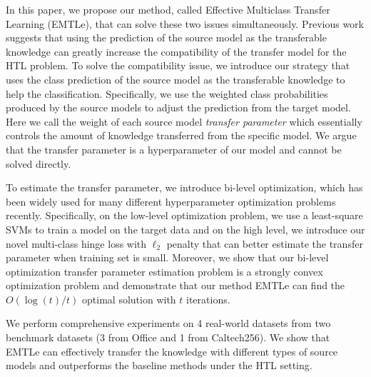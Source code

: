 In this paper, we propose our method, {called Effective Multiclass Transfer Learning (EMTLe)}, that can solve these two issues simultaneously. Previous work \cite{jie2011multiclass} suggests that using the prediction of the source model as the transferable knowledge can greatly increase the compatibility of the transfer model for the HTL problem. To solve the compatibility issue, we introduce our strategy that uses the class prediction of the source model as the transferable knowledge to help the classification. Specifically, we use the weighted class probabilities produced by the source models to adjust the prediction from the target model. Here we call the weight of each source model \textit{transfer parameter} which essentially controls the amount of knowledge transferred from the specific model. We argue that the transfer parameter is a hyperparameter of our model and cannot be solved directly.

To estimate the transfer parameter, we introduce bi-level optimization\cite{Pedregosa16}, which has been widely used for many different hyperparameter optimization problems recently. Specifically, on the low-level optimization problem, we use a least-square SVMs to train a model on the target data and on the high level, we introduce our novel multi-class hinge loss with $\ell_2$ penalty that can better estimate the transfer parameter when training set is small. Moreover, we show that our bi-level optimization transfer parameter estimation problem is a strongly convex optimization problem and demonstrate that our method EMTLe can find the $O({\log(t)}/{t})$ optimal solution with $t$ iterations. 

We perform comprehensive experiments on 4 real-world datasets from two benchmark datasets (3 from Office and 1 from Caltech256). We show that EMTLe can effectively transfer the knowledge with different types of source models and outperforms the baseline methods under the HTL setting. %

